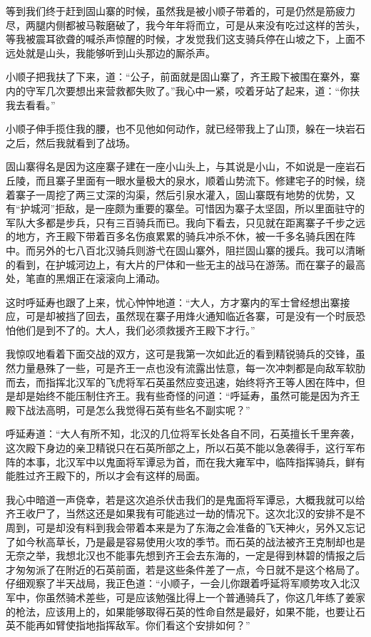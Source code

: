 等到我们终于赶到固山寨的时候，虽然我是被小顺子带着的，可是仍然是筋疲力尽，两腿内侧都被马鞍磨破了，我今年年将而立，可是从来没有吃过这样的苦头，等我被震耳欲聋的喊杀声惊醒的时候，才发觉我们这支骑兵停在山坡之下，上面不远处就是山头，我能够听到山头那边的厮杀声。

小顺子把我扶了下来，道：“公子，前面就是固山寨了，齐王殿下被围在寨外，寨内的守军几次要想出来营救都失败了。”我心中一紧，咬着牙站了起来，道：“你扶我去看看。”

小顺子伸手揽住我的腰，也不见他如何动作，就已经带我上了山顶，躲在一块岩石之后，然后我就看到了战场。

固山寨得名是因为这座寨子建在一座小山头上，与其说是小山，不如说是一座岩石丘陵，而且寨子里面有一眼水量极大的泉水，顺着山势流下。修建宅子的时候，绕着寨子一周挖了两三丈深的沟渠，然后引泉水灌入，固山寨既有地势的优势，又有“护城河”拒敌，是一座颇为重要的寨垒。可惜因为寨子太坚固，所以里面驻守的军队大多都是步兵，只有三百骑兵而已。我向下看去，只见就在距离寨子千步之远的地方，齐王殿下带着百多名伤痕累累的骑兵冲杀不休，被一千多名骑兵困在阵中。而另外的七八百北汉骑兵则游弋在固山寨外，阻拦固山寨的援兵。我可以清晰的看到，在护城河边上，有大片的尸体和一些无主的战马在游荡。而在寨子的最高处，笔直的黑烟正在滚滚向上涌动。

这时呼延寿也跟了上来，忧心忡忡地道：“大人，方才寨内的军士曾经想出寨接应，可是却被挡了回去，虽然现在寨子用烽火通知临近各寨，可是没有一个时辰恐怕他们是到不了的。大人，我们必须救援齐王殿下才行。”

我惊叹地看着下面交战的双方，这可是我第一次如此近的看到精锐骑兵的交锋，虽然力量悬殊了一些，可是齐王一点也没有流露出怯意，每一次冲刺都是向敌军软肋而去，而指挥北汉军的飞虎将军石英虽然应变迅速，始终将齐王等人困在阵中，但是却是始终不能压制住齐王。我有些奇怪的问道：“呼延寿，虽然可能是因为齐王殿下战法高明，可是怎么我觉得石英有些名不副实呢？”

呼延寿道：“大人有所不知，北汉的几位将军长处各自不同，石英擅长千里奔袭，这次殿下身边的亲卫精锐只在石英所部之上，所以石英不能以急袭得手，这行军布阵的本事，北汉军中以鬼面将军谭忌为首，而在我大雍军中，临阵指挥骑兵，鲜有能胜过齐王殿下的，所以才会有这样的局面。

我心中暗道一声侥幸，若是这次追杀伏击我们的是鬼面将军谭忌，大概我就可以给齐王收尸了，当然这还是如果我有可能逃过一劫的情况下。这次北汉的安排不是不周到，可是却没有料到我会带着本来是为了东海之会准备的飞天神火，另外又忘记了如今秋高草长，乃是最是容易使用火攻的季节。而石英的战法被齐王克制却也是无奈之举，我想北汉也不能事先想到齐王会去东海的，一定是得到林碧的情报之后才匆匆派了在附近的石英前面，若是这些条件差了一点，今日就不是这个格局了。仔细观察了半天战局，我正色道：“小顺子，一会儿你跟着呼延将军顺势攻入北汉军中，你虽然骑术差些，可是应该勉强比得上一个普通骑兵了，你这几年练了姜家的枪法，应该用上的，如果能够取得石英的性命自然是最好，如果不能，也要让石英不能再如臂使指地指挥敌军。你们看这个安排如何？”

